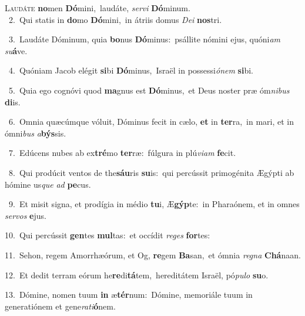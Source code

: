 \lettrine{\initial\textcolor{\initialcolor}{L}}{audáte} \textbf{no}\-men \textbf{Dó}\-mini,~\star laudáte, \textit{ser}\-\textit{vi} \textbf{Dó}\-minum.\\
{\numbfont\textcolor{\numbcolor}{~2.}}~Qui statis in \textbf{do}\-mo \textbf{Dó}\-mini,~\star in átriis domus \textit{De}\-\textit{i} \textbf{nos}\-tri.\par
{\numbfont\textcolor{\numbcolor}{~3.}}~Laudáte Dóminum, quia \textbf{bo}\-nus \textbf{Dó}\-minus:~\star psállite nómini ejus, quóni\textit{am} \textit{su}\-\textbf{á}ve.\par
{\numbfont\textcolor{\numbcolor}{~4.}}~Quóniam Jacob elégit \textbf{si}\-bi \textbf{Dó}\-minus,~\star Israël in possessi\-\textit{ó}\-\textit{nem} \textbf{si}\-bi.\par
{\numbfont\textcolor{\numbcolor}{~5.}}~Quia ego cognóvi quod \textbf{ma}\-gnus est \textbf{Dó}\-minus,~\star et Deus noster præ óm\-\textit{ni}\-\textit{bus} \textbf{di}\-is.\par
{\numbfont\textcolor{\numbcolor}{~6.}}~Omnia quæcúmque vóluit, Dóminus fecit in cælo, \textbf{et} in \textbf{ter}\-ra,~\star in mari, et in ómni\textit{bus} \textit{a}\-\textbf{býs}sis.\par
{\numbfont\textcolor{\numbcolor}{~7.}}~Edúcens nubes ab ex\-\textbf{tré}\-mo \textbf{ter}\-ræ:~\star fúlgura in plú\-\textit{vi}\-\textit{am} \textbf{fe}\-cit.\par
{\numbfont\textcolor{\numbcolor}{~8.}}~Qui prodúcit ventos de the\-\textbf{sáu}\-ris \textbf{su}\-is:~\star qui percússit primogénita Ægýpti ab hómine us\textit{que} \textit{ad} \textbf{pe}\-cus.\par
{\numbfont\textcolor{\numbcolor}{~9.}}~Et misit signa, et prodígia in médio \textbf{tu}\-i, Æ\-\textbf{gýp}\-te:~\star in Pharaónem, et in omnes \textit{ser}\-\textit{vos} \textbf{e}\-jus.\par
{\numbfont\textcolor{\numbcolor}{10.}}~Qui percússit \textbf{gen}\-tes \textbf{mul}\-tas:~\star et occídit \textit{re}\-\textit{ges} \textbf{for}\-tes:\par
{\numbfont\textcolor{\numbcolor}{11.}}~Sehon, regem Amorrhæórum, et Og, \textbf{re}\-gem \textbf{Ba}\-san,~\star et ómnia \textit{re}\-\textit{gna} \textbf{Chá}\-naan.\par
{\numbfont\textcolor{\numbcolor}{12.}}~Et dedit terram eórum he\-\textbf{re}\-di\-\textbf{tá}\-tem,~\star hereditátem Israël, pó\-\textit{pu}\-\textit{lo} \textbf{su}\-o.\par
{\numbfont\textcolor{\numbcolor}{13.}}~Dómine, nomen tuum \textbf{in} æ\-\textbf{tér}\-num:~\star Dómine, memoriále tuum in generatiónem et gene\-\textit{ra}\-\textit{ti}\textbf{ó}nem.\par
